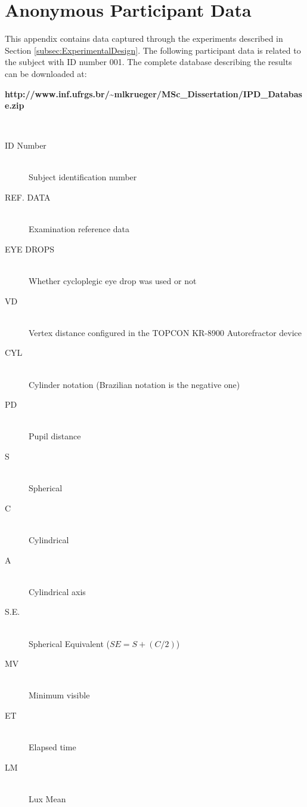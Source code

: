 
\chapter{Anonymous Participant Data}
\label{chap:AppendixA}

This appendix contains data captured through the experiments described in Section \ref{subsec:ExperimentalDesign}. The following participant data is related to the subject with ID number 001. The complete database describing the results can be downloaded at: 

\noindent
\textbf{http://www.inf.ufrgs.br/\textasciitilde mlkrueger/MSc\_Dissertation/IPD\_Database.zip}

~

\begin{description}

	\item[ID Number]			\hfill \\
	Subject identification number
	
	\item[REF. DATA]			\hfill \\
	Examination reference data
	
	\item[EYE DROPS] 			\hfill \\
	Whether cycloplegic eye drop was used or not
	
	\item[VD]					\hfill \\
	Vertex distance configured in the TOPCON KR-8900 Autorefractor device
	
	\item[CYL]					\hfill \\
	Cylinder notation (Brazilian notation is the negative one)
	
	\item[PD] 					\hfill \\
	Pupil distance
	
	\item[S]					\hfill \\
	Spherical
	
	\item[C]					\hfill \\
	Cylindrical
	
	\item[A] 					\hfill \\
	Cylindrical axis
	
	\item[S.E.]					\hfill \\
	Spherical Equivalent ($SE = S+(C/2)$)
	
	\item[MV]					\hfill \\
	Minimum visible
	
	\item[ET] 					\hfill \\
	Elapsed time
	
	\item[LM]					\hfill \\
	Lux Mean
	
\end{description}

